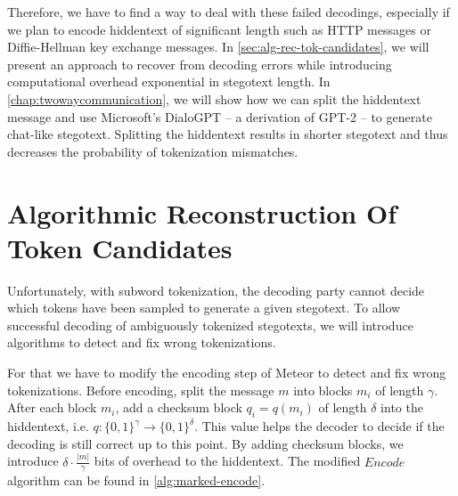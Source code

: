
Therefore, we have to find a way to deal with these failed decodings, especially if we plan to encode hiddentext of significant length such as HTTP messages or Diffie-Hellman key exchange messages.
In \autoref{sec:alg-rec-tok-candidates}, we will present an approach to recover from decoding errors while introducing computational overhead exponential in stegotext length. 
In \autoref{chap:twowaycommunication}, we will show how we can split the hiddentext message and use Microsoft's DialoGPT -- a derivation of GPT-2 -- to generate chat-like stegotext.
Splitting the hiddentext results in shorter stegotext and thus decreases the probability of tokenization mismatches.



\section{Algorithmic Reconstruction Of Token Candidates}
\label{sec:alg-rec-tok-candidates}

Unfortunately, with subword tokenization, the decoding party cannot decide which tokens have been sampled to generate a given stegotext.
To allow successful decoding of ambiguously tokenized stegotexts, we will introduce algorithms to detect and fix wrong tokenizations.


For that we have to modify the encoding step of Meteor to detect and fix wrong tokenizations.
Before encoding, split the message $m$ into blocks $m_i$ of length $\gamma$.
After each block $m_i$, add a checksum block $q_i = q(m_i)$ of length $\delta$ into the hiddentext, i.e. $q \colon \{ 0,1 \}^\gamma \rightarrow \{ 0,1 \}^\delta$.
This value helps the decoder to decide if the decoding is still correct up to this point.
By adding checksum blocks, we introduce $\delta \cdot \frac{|m|}{\gamma}$ bits of overhead to the hiddentext.
The modified $Encode$ algorithm can be found in \autoref{alg:marked-encode}.

